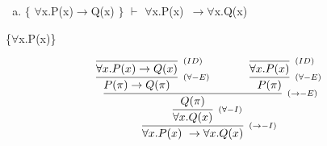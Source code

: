 \documentclass[aspectratio=43]{beamer}
\newcommand{\ria}{$\rightarrow$}
\newcommand{\fall}{$\forall$}
\begin{document}
     \begin{frame}[fragile]
    
    	\begin{enumerate}[f)]
			\item $\{$ \fall x.P(x)\ria Q(x) $\}$ $\vdash$ \fall x.P(x)\ \ria \fall x.Q(x) \\
		\end{enumerate}
        \{\fall x.P(x)\}
        \vspace{40pt}
        
        \[
        \begin{array}{c}
		
        	\infer[_{(\to -I)}]
            	{\forall x.P(x)\ \to \forall x.Q(x)}
            	{\infer[_{(\forall -I)}] 
                	{\forall x.Q(x)}
                    {\infer[_{(\to -E)}]
                    	{Q(\pi)}
                        {\infer[_{(\forall -E)}]
                        	{P(\pi)\rightarrow Q(\pi)}
                            {\infer[_{(ID)}]
                            	{\forall x.P(x)\to Q(x)}
                            	{}
                            }
                        \hspace{35pt} 
                        \infer[_{(\forall -E)}] 
                        	{P(\pi)}
                            {\infer[_{(ID)}]
                            	{\forall x.P(x)}
                                {}
                            }
                        }
                    }
                 }   
        
		\end{array}
        \]
        
	\end{frame}
    
    
\end{document}
